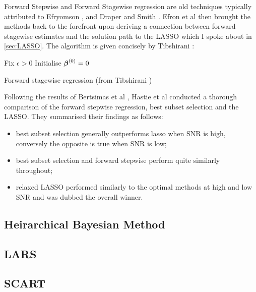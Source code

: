 Forward Stepwise and Forward Stagewise regression are old techniques typically attributed to Efryomson , and Draper and Smith . Efron et al  then brought the methods back to the forefront upon deriving a connection between forward stagewise estimates and the solution path to the LASSO which I spoke about in \cref{sec:LASSO}. The algorithm is given concisely by Tibshirani :

\begin{algorithm}[H]
    Fix $\epsilon>0$\;
    Initialise $\boldsymbol{\beta}^{(0)}=0$\;
    \caption{Forward stagewise regression (from Tibshirani )}\label{alg:forward-stagewise-regression}
\end{algorithm}

Following the results of Bertsimas et al , Hastie et al  conducted a thorough comparison of the forward stepwise regression, best subset selection and the LASSO. They summarised their findings as follows:

\begin{itemize}
    \item best subset selection generally outperforms lasso when SNR is high, conversely the opposite is true when SNR is low; 
    \item best subset selection and forward stepwise perform quite similarly throughout;
    \item relaxed LASSO performed similarly to the optimal methods at high and low SNR and was dubbed the overall winner.
\end{itemize}

\subsection{Heirarchical Bayesian Method} 
\subsection{LARS}
\subsection{SCART}
